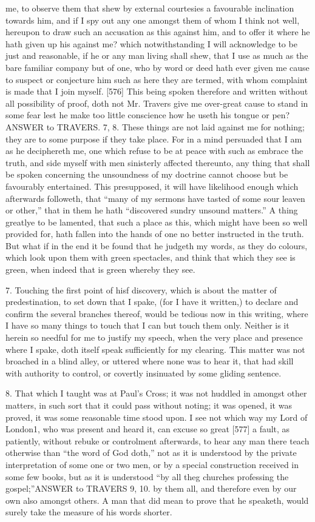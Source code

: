 me, to observe them that shew by external courtesies a favourable inclination towards him, and if I spy out any one amongst them of whom I think not well, hereupon to draw such an accusation as this against him, and to offer it where he hath given up his against me? which notwithstanding I will acknowledge to be just and reasonable, if he or any man living shall shew, that I use as much as the bare familiar company but of one, who by word or deed hath ever given me cause to suspect or conjecture him such as here they are termed, with whom complaint is made that I join myself. [576] This being spoken therefore and written without all possibility of proof, doth not Mr. Travers give me over-great cause to stand in some fear lest he make too little conscience how he useth his tongue or pen?ANSWER to TRAVERS. 7, 8. These things are not laid against me for nothing; they are to some purpose if they take place. For in a mind persuaded that I am as he deciphereth me, one which refuse to be at peace with such as embrace the truth, and side myself with men sinisterly affected thereunto, any thing that shall be spoken concerning the unsoundness of my doctrine cannot choose but be favourably entertained. This presupposed, it will have likelihood enough which afterwards followeth, that “many of my sermons have tasted of some sour leaven or other,” that in them he hath “discovered sundry unsound matters.” A thing greatlye to be lamented, that such a place as this, which might have been so well provided for, hath fallen into the hands of one no better instructed in the truth. But what if in the end it be found that he judgeth my words, as they do colours, which look upon them with green spectacles, and think that which they see is green, when indeed that is green whereby they see.

7. Touching the first point of hisf discovery, which is about the matter of predestination, to set down that I spake, (for I have it written,) to declare and confirm the several branches thereof, would be tedious now in this writing, where I have so many things to touch that I can but touch them only. Neither is it herein so needful for me to justify my speech, when the very place and presence where I spake, doth itself speak sufficiently for my clearing. This matter was not broached in a blind alley, or uttered where none was to hear it, that had skill with authority to control, or covertly insinuated by some gliding sentence.

8. That which I taught was at Paul’s Cross; it was not huddled in amongst other matters, in such sort that it could pass without noting; it was opened, it was proved, it was some reasonable time stood upon. I see not which way my Lord of London1, who was present and heard it, can excuse so great [577] a fault, as patiently, without rebuke or controlment afterwards, to hear any man there teach otherwise than “the word of God doth,” not as it is understood by the private interpretation of some one or two men, or by a special construction received in some few books, but as it is understood “by all theg churches professing the gospel;”ANSWER to TRAVERS 9, 10. by them all, and therefore even by our own also amongst others. A man that did mean to prove that he speaketh, would surely take the measure of his words shorter.

